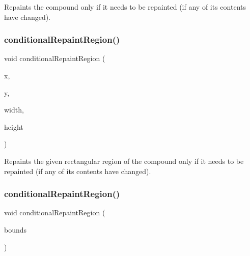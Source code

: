 Repaints the compound only if it needs to be repainted (if any of its contents have changed). 

\mbox{\label{classGCompound_aedd4b792311d946eeaf44b0de337a408}} 
\subsubsection{\texorpdfstring{conditional\+Repaint\+Region()}{conditionalRepaintRegion()}\hspace{0.1cm}{\footnotesize\ttfamily [1/2]}}
{\footnotesize\ttfamily void conditional\+Repaint\+Region (\begin{DoxyParamCaption}\item[{int}]{x,  }\item[{int}]{y,  }\item[{int}]{width,  }\item[{int}]{height }\end{DoxyParamCaption})\hspace{0.3cm}{\ttfamily [virtual]}}



Repaints the given rectangular region of the compound only if it needs to be repainted (if any of its contents have changed). 

\mbox{\label{classGCompound_a3932a12278752db368e24fa404e446aa}} 
\subsubsection{\texorpdfstring{conditional\+Repaint\+Region()}{conditionalRepaintRegion()}\hspace{0.1cm}{\footnotesize\ttfamily [2/2]}}
{\footnotesize\ttfamily void conditional\+Repaint\+Region (\begin{DoxyParamCaption}\item[{const \mbox{\hyperlink{classGRectangle}{G\+Rectangle}} \&}]{bounds }\end{DoxyParamCaption})\hspace{0.3cm}{\ttfamily [virtual]}}



